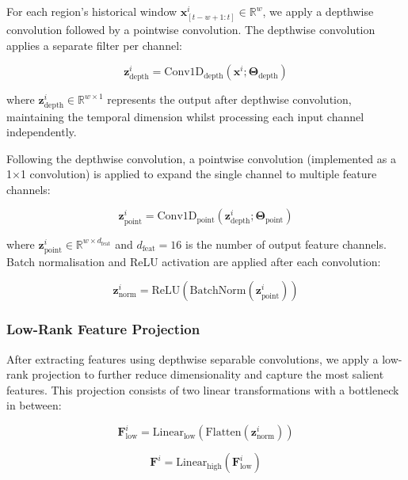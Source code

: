 \documentclass[a4paper,fleqn]{cas-dc}
\begin{document}
For each region's historical window $\mathbf{x}^i_{[t-w+1:t]} \in \mathbb{R}^w$, we apply a depthwise convolution followed by a pointwise convolution. The depthwise convolution applies a separate filter per channel:

\begin{equation}
\mathbf{z}^i_{\text{depth}} = \text{Conv1D}_{\text{depth}}(\mathbf{x}^i; \boldsymbol{\Theta}_{\text{depth}})
\end{equation}

where $\mathbf{z}^i_{\text{depth}} \in \mathbb{R}^{w \times 1}$ represents the output after depthwise convolution, maintaining the temporal dimension whilst processing each input channel independently.

Following the depthwise convolution, a pointwise convolution (implemented as a 1×1 convolution) is applied to expand the single channel to multiple feature channels:

\begin{equation}
\mathbf{z}^i_{\text{point}} = \text{Conv1D}_{\text{point}}(\mathbf{z}^i_{\text{depth}}; \boldsymbol{\Theta}_{\text{point}})
\end{equation}

where $\mathbf{z}^i_{\text{point}} \in \mathbb{R}^{w \times d_{\text{feat}}}$ and $d_{\text{feat}} = 16$ is the number of output feature channels. Batch normalisation and ReLU activation are applied after each convolution:

\begin{equation}
\mathbf{z}^i_{\text{norm}} = \text{ReLU}(\text{BatchNorm}(\mathbf{z}^i_{\text{point}}))
\end{equation}

\subsubsection{Low-Rank Feature Projection}

After extracting features using depthwise separable convolutions, we apply a low-rank projection to further reduce dimensionality and capture the most salient features. This projection consists of two linear transformations with a bottleneck in between:

\begin{equation}
\mathbf{F}^i_{\text{low}} = \text{Linear}_{\text{low}}(\text{Flatten}(\mathbf{z}^i_{\text{norm}}))
\end{equation}

\begin{equation}
\mathbf{F}^i = \text{Linear}_{\text{high}}(\mathbf{F}^i_{\text{low}})
\end{equation}
\end{document}
